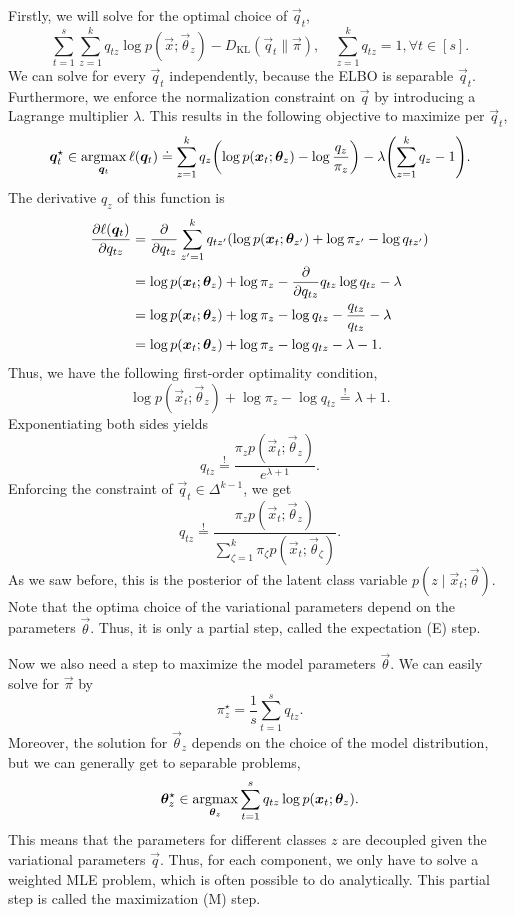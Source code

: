 Firstly, we will solve for the optimal choice of $\vec{q}_t$, \[
    \sum_{t=1}^{s} \sum_{z=1}^{k} q_{tz} \log p(\vec{x}; \vec{\theta}_z) - D_{\mathrm{KL}}(\vec{q}_t \| \vec{\pi}), \quad \sum_{z=1}^{k} q_{tz} = 1, \forall t \in [s].
\]
We can solve for every $\vec{q}_t$ independently, because the ELBO is separable \wrt $\vec{q}_t$.
Furthermore, we enforce the normalization constraint on $\vec{q}$ by introducing a Lagrange
multiplier $\lambda$. This results in the following objective to maximize per $\vec{q}_t$, \[
    \vec{q}_t^\star \in \argmax_{\vec{q}_t} \ell(\vec{q}_t) \doteq \sum_{z=1}^{k} q_z \lft( \log p(\vec{x}_t; \vec{\theta}_z) - \log \frac{q_z}{\pi_z} \rgt) - \lambda \lft( \sum_{z=1}^{k} q_z - 1 \rgt).
\]
The derivative \wrt $q_z$ of this function is
\begin{align*}
    \pdv{\ell(\vec{q}_t)}{q_{tz}} & = \pdv*{\sum_{z'=1}^{k} q_{tz'} \lft( \log p(\vec{x}_t; \vec{\theta}_{z'}) + \log \pi_{z'} - \log q_{tz'} \rgt)}{q_{tz}} \\
                                  & = \log p(\vec{x}_t; \vec{\theta}_z) + \log \pi_z - \pdv*{q_{tz} \log q_{tz}}{q_{tz}} - \lambda                           \\
                                  & = \log p(\vec{x}_t; \vec{\theta}_z) + \log \pi_z - \log q_{tz} - \frac{q_{tz}}{q_{tz}} - \lambda                         \\
                                  & = \log p(\vec{x}_t; \vec{\theta}_z) + \log \pi_z - \log q_{tz} - \lambda - 1.
\end{align*}
Thus, we have the following first-order optimality condition, \[
    \log p(\vec{x}_t; \vec{\theta}_z) + \log \pi_z - \log q_{tz} \overset{!}{=} \lambda + 1.
\]
Exponentiating both sides yields \[
    q_{tz} \overset{!}{=} \frac{\pi_z p(\vec{x}_t; \vec{\theta}_z)}{e^{\lambda+1}}.
\]
Enforcing the constraint of $\vec{q}_t \in \Delta^{k-1}$, we get \[
    q_{tz} \overset{!}{=} \frac{\pi_z p(\vec{x}_t; \vec{\theta}_z)}{\sum_{\zeta=1}^{k} \pi_{\zeta}p(\vec{x}_t; \vec{\theta}_{\zeta})}.
\]
As we saw before, this is the posterior of the latent class variable $p(z \mid \vec{x}_t;
    \vec{\theta})$. Note that the optima choice of the variational parameters depend on the parameters
$\vec{\theta}$. Thus, it is only a partial step, called the expectation (E) step.

Now we also need a step to maximize the model parameters $\vec{\theta}$. We can easily solve for
$\vec{\pi}$ by \[
    \pi^{\star}_z = \frac{1}{s} \sum_{t=1}^{s} q_{tz}.
\]
Moreover, the solution for $\vec{\theta}_z$ depends on the choice of the model distribution, but we
can generally get to separable problems, \[
    \bm{\theta}^{\star}_z \in \operatorname*{argmax}_{\bm{\theta}_z} \sum_{t=1}^{s} q_{tz} \log p(\bm{x}_t; \bm{\theta}_z).
\]
This means that the parameters for different classes $z$ are decoupled given the variational
parameters $\vec{q}$. Thus, for each component, we only have to solve a weighted MLE problem, which
is often possible to do analytically. This partial step is called the maximization (M) step.

